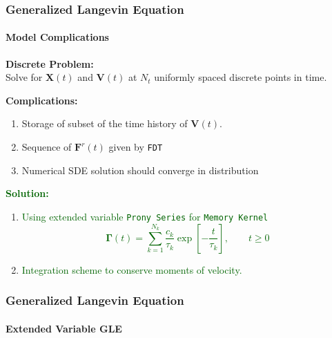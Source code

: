 \documentclass[a4paper,10pt]{beamer}
\newcommand{\BS}[1]{\boldsymbol{#1}}
\newcommand{\sqb}[1]{\left[ #1 \right]}
\begin{document}
	\begin{frame}
		\frametitle{Generalized Langevin Equation}
		\framesubtitle{Model Complications}
		\textbf{Discrete Problem:} \\
		Solve for $\BS{X}(t)$ and $\BS{V}(t)$ at $N_{t}$ uniformly spaced discrete points in time.
		
		\textcolor{burgundy}{\textbf{Complications:}} \\
		\begin{enumerate}
			\item {\textcolor{burgundy}{Storage of subset of the time history of $\BS{V}(t)$.}}
			\item {\textcolor{burgundy}{Sequence of $\BS{F}^{r}(t)$ given by \texttt{FDT}}}
			\item {\textcolor{burgundy}{Numerical SDE solution should converge in distribution}}
		\end{enumerate}
		\textcolor{darkgreen}{\textbf{Solution:}}\\
		\begin{enumerate}
			\item {\textcolor{darkgreen}{Using extended variable \texttt{Prony Series} for \texttt{Memory Kernel}
			$$ \BS{\Gamma}(t) = \sum_{k=1}^{N_{k}} \frac{c_{k}}{\tau_{k}} \exp \sqb{-\frac{t}{\tau_{k}}}, \qquad t \geq 0$$}}
			\item {\textcolor{darkgreen}{Integration scheme to conserve moments of velocity.}}
		\end{enumerate}
	\end{frame}

	\begin{frame}
		\frametitle{Generalized Langevin Equation}
		\framesubtitle{Extended Variable GLE}
	\end{frame}
\end{document}
